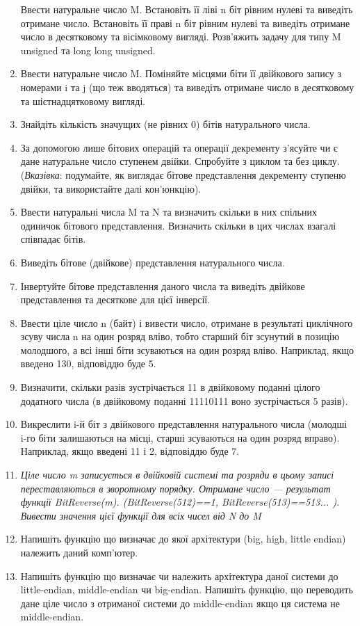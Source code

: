 \documentclass[]{article}
\begin{document}
\begin{enumerate}
  Ввести натуральне число M. Встановіть її ліві n біт рівним нулеві та
  виведіть отримане число. Встановіть її праві n біт рівним нулеві та
  виведіть отримане число в десятковому та вісімковому вигляді.
  Розв'яжить задачу для типу M unsigned та long long unsigned.
\item
  Ввести натуральне число M. Поміняйте місцями біти її двійкового запису
  з номерами i та j (що теж вводяться) та виведіть отримане число в
  десятковому та шістнадцятковому вигляді.
\item
  Знайдіть кількість значущих (не рівних 0) бітів натурального числа.
\item
  За допомогою лише бітових операцій та операції декременту з'ясуйте чи
  є дане натуральне число ступенем двійки. Спробуйте з циклом та без
  циклу. (\emph{Вказівка}: подумайте, як виглядає бітове представлення
  декременту ступеню двійки, та використайте далі кон'юнкцію).
\item
  Ввести натуральні числа M та N та визначить скільки в них спільних
  одиничок бітового представлення. Визначить скільки в цих числах
  взагалі співпадає бітів.
\item
  Виведіть бітове (двійкове) представлення натурального числа.
\item
  Інвертуйте бітове представлення даного числа та виведіть двійкове
  представлення та десяткове для цієї інверсії.
\item
  Ввести ціле число n (байт) і вивести число, отримане в результаті
  циклічного зсуву числа n на один розряд вліво, тобто старший біт
  зсунутий в позицію молодшого, а всі інші біти зсуваються на один
  розряд вліво. Наприклад, якщо введено 130, відповіддю буде 5.
\item
  Визначити, скільки разів зустрічається 11 в двійковому поданні цілого
  додатного числа (в двійковому поданні 11110111 воно зустрічається 5
  разів).
\item
  Викреслити i-й біт з двійкового представлення натурального числа
  (молодші i-го біти залишаються на місці, старші зсуваються на один
  розряд вправо). Наприклад, якщо введені 11 і 2, відповіддю буде 7.
\item
  \emph{Ціле число m записується в двійковій системі та розряди в цьому
  записі переставляються в зворотному порядку. Отримане число ---
  результат функції BitReverse(m). (BitReverse(512)==1,
  BitReverse(513)==513... ). Вивести значення цієї функції для всіх
  чисел від N до M}
\item
  Напишіть функцію що визначає до якої архітектури (big, high, little
  endian) належить даний комп'ютер.
\item
  Напишіть функцію що визначає чи належить архітектура даної системи до
  little-endian, middle-endian чи big-endian. Напишіть функцію, що
  переводить дане ціле число з отриманої системи до middle-endian якщо
  ця система не middle-endian.
\end{enumerate}
\end{document}
